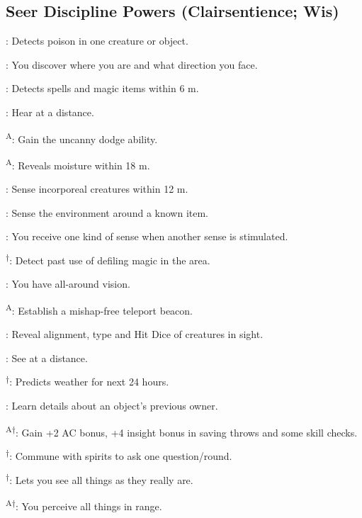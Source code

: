 \subsection{Seer Discipline Powers {\normalsize(Clairsentience; Wis)}}
\begin{enumerate*}
\item {}: Detects poison in one creature or object.

: You discover where you are and what direction you face.

\item {}: Detects spells and magic items within 6 m. %

\item {}: Hear at a distance.

\textsuperscript{A}: Gain the uncanny dodge ability. %

\textsuperscript{A}: Reveals moisture within 18 m.

: Sense incorporeal creatures within 12 m. %

: Sense the environment around a known item.

: You receive one kind of sense when another sense is stimulated.

\textsuperscript{$\dagger$}: Detect past use of defiling magic in the area.

: You have all-around vision.

\item {}\textsuperscript{A}: Establish a mishap-free teleport beacon.

: Reveal alignment, type and Hit Dice of creatures in sight.

: See at a distance.

\textsuperscript{$\dagger$}: Predicts weather for next 24 hours.

\item {}: Learn details about an object's previous owner.

\textsuperscript{A$\dagger$}: Gain +2 AC bonus, +4 insight bonus in saving throws and some skill checks.

\item 
\item 
\item {}\textsuperscript{$\dagger$}: Commune with spirits to ask one question/round.

\textsuperscript{$\dagger$}: Lets you see all things as they really are.

\item {}\textsuperscript{A$\dagger$}: You perceive all things in range. %
\end{enumerate*}



